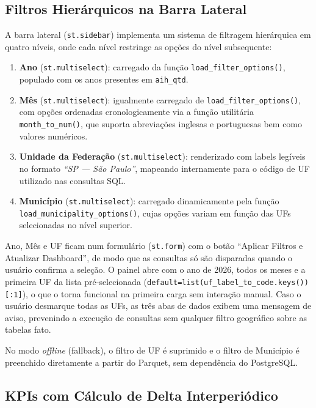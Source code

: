 \documentclass[12pt,a4paper]{report}
\begin{document}
\subsection{Filtros Hierárquicos na Barra Lateral}

A barra lateral (\texttt{st.sidebar}) implementa um sistema de filtragem hierárquica
em quatro níveis, onde cada nível restringe as opções do nível subsequente:

\begin{enumerate}
    \item \textbf{Ano} (\texttt{st.multiselect}): carregado da função
    \texttt{load\_filter\_options()}, populado com os anos presentes em
    \texttt{aih\_qtd}.
    \item \textbf{Mês} (\texttt{st.multiselect}): igualmente carregado de
    \texttt{load\_filter\_options()}, com opções ordenadas cronologicamente via a
    função utilitária \texttt{month\_to\_num()}, que suporta abreviações inglesas
    e portuguesas bem como valores numéricos.
    \item \textbf{Unidade da Federação} (\texttt{st.multiselect}): renderizado com
    labels legíveis no formato \textit{``SP — São Paulo''}, mapeando internamente
    para o código de UF utilizado nas consultas SQL.
    \item \textbf{Município} (\texttt{st.multiselect}): carregado dinamicamente pela
    função \texttt{load\_municipality\_options()}, cujas opções variam em função das
    UFs selecionadas no nível superior.
\end{enumerate}

Ano, Mês e UF ficam num formulário (\texttt{st.form}) com o botão ``Aplicar Filtros e
Atualizar Dashboard'', de modo que as consultas só são disparadas quando o usuário
confirma a seleção. O painel abre com o ano de 2026, todos os meses e a primeira UF da
lista pré-selecionada (\texttt{default=list(uf\_label\_to\_code.keys())[:1]}), o que o
torna funcional na primeira carga sem interação manual. Caso o usuário desmarque todas as UFs, as três abas de dados
exibem uma mensagem de aviso, prevenindo a execução de consultas sem qualquer filtro
geográfico sobre as tabelas fato.

No modo \textit{offline} (fallback), o filtro de UF é suprimido e o filtro de
Município é preenchido diretamente a partir do Parquet, sem dependência do PostgreSQL.

\subsection{KPIs com Cálculo de Delta Interperiódico}
\end{document}
